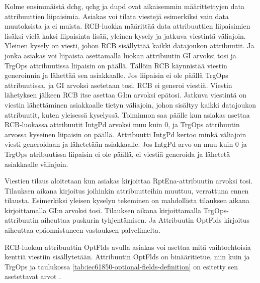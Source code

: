 Kolme ensimmäistä dchg, qchg ja dupd ovat aikaisemmin määrittettyjen data attribuuttien liipaisimia. Asiakas voi tilata viestejä esimerkiksi vain data muutoksista ja ei muista. RCB-luokka määrittää data attribuuttien liipaisimien lisäksi vielä kaksi liipaisinta lisää, yleinen kysely ja jatkuva viestintä väliajoin. Yleinen kysely on viesti, johon RCB sisällyttää kaikki datajoukon attribuutit. Ja jonka asiakas voi liipaista asettamalla luokan attribuutin GI arvoksi tosi ja TrgOps attribuutissa liipaisin on päällä. Tällöin RCB käynnistää viestin generoinnin ja lähettää sen asiakkaalle. Jos liipaisin ei ole päällä TrgOps attribuutissa, ja GI arvoksi asetetaan tosi. RCB ei generoi viestiä. Viestin lähetyksen jälkeen RCB itse asettaa GI:n arvoksi epätosi. Jatkuva viestintä on viestin lähettäminen asiakkaalle tietyn väliajoin, johon sisältyy kaikki datajoukon attribuutit, kuten yleisessä kyselyssä. Toiminnon saa päälle kun asiakas asettaa RCB-luokassa attribuutit IntgPd arvoksi muu kuin 0, ja TrgOps attribuutin arvossa kyseinen liipaisin on päällä. Attribuutti IntgPd kertoo minkä väliajoin viesti generoidaan ja lähetetään asiakkaalle. Jos IntgPd arvo on muu kuin 0 ja TrgOps atribuutissa liipaisin ei ole päällä, ei viestiä generoida ja lähetetä asiakkaalle väliajoin.

Viestien tilaus aloitetaan kun asiakas kirjoittaa RptEna-attribuutin arvoksi tosi. Tilauksen aikana kirjoitus joihinkin attribuutteihin muuttuu, verrattuna ennen tilausta. Esimerkiksi yleisen kyselyn tekeminen on mahdollista tilauksen aikana kirjoittamalla GI:n arvoksi tosi. Tilauksen aikana kirjoittamalla TrgOps-attribuutin aiheuttaa puskurin tyhjentämisen. Ja Attribuutin OptFlds kirjoitus aiheuttaa epäonnistuneen vastauksen palvelimelta.

RCB-luokan attribuuttin OptFlds avulla asiakas voi asettaa mitä vaihtoehtoisia kenttiä viestiin sisällytetään. Attribuutin OptFlds on binääritietue, niin kuin ja TrgOps ja taulukossa \ref{tab:iec61850-optional-fields-definition} on esitetty sen asetettavat arvot \cite[s.~98]{IEC61850-7-2}.

